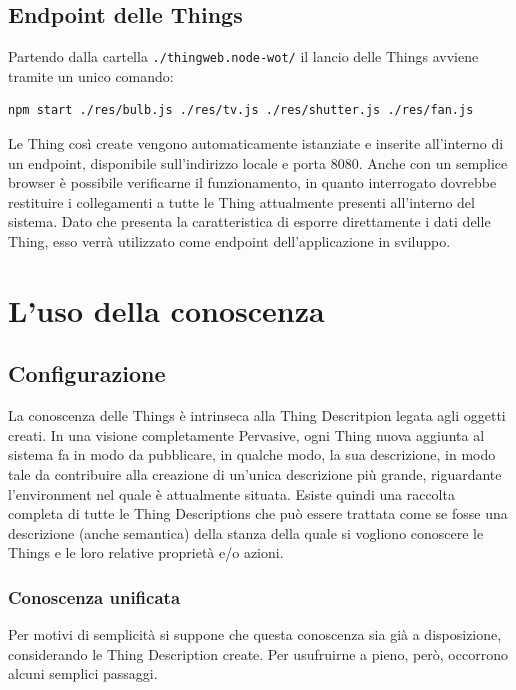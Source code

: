 \documentclass[12pt,a4paper,openright,oneside]{report}
\begin{document}
\section{Endpoint delle Things}
Partendo dalla cartella \texttt{./thingweb.node-wot/} il lancio delle Things avviene tramite un unico comando:

\begin{lstlisting}[language=bash]
	npm start ./res/bulb.js ./res/tv.js ./res/shutter.js ./res/fan.js
\end{lstlisting}

Le Thing così create vengono automaticamente istanziate e inserite all'interno di un endpoint, disponibile sull'indirizzo locale e porta 8080. Anche con un semplice browser è possibile verificarne il funzionamento, in quanto interrogato dovrebbe restituire i collegamenti a tutte le Thing attualmente presenti all'interno del sistema. Dato che presenta la caratteristica di esporre direttamente i dati delle Thing, esso verrà utilizzato come endpoint dell'applicazione in sviluppo.\\


\clearpage{\pagestyle{empty}\cleardoublepage}
\chapter{L'uso della conoscenza}           %
\lhead[\fancyplain{}{\bfseries\thepage}]{\fancyplain{}{\bfseries\rightmark}}  

\section{Configurazione}
La conoscenza delle Things è intrinseca alla Thing Descritpion legata agli oggetti creati. In una visione completamente Pervasive, ogni Thing nuova aggiunta al sistema fa in modo da pubblicare, in qualche modo, la sua descrizione, in modo tale da contribuire alla creazione di un'unica descrizione più grande, riguardante l'environment nel quale è attualmente situata. Esiste quindi una raccolta completa di tutte le Thing Descriptions che può essere trattata come se fosse una descrizione (anche semantica) della stanza della quale si vogliono conoscere le Things e le loro relative proprietà e/o azioni.\\

\subsection{Conoscenza unificata}
Per motivi di semplicità si suppone che questa conoscenza sia già a disposizione, considerando le Thing Description create. Per usufruirne a pieno, però, occorrono alcuni semplici passaggi.\\
\end{document}
